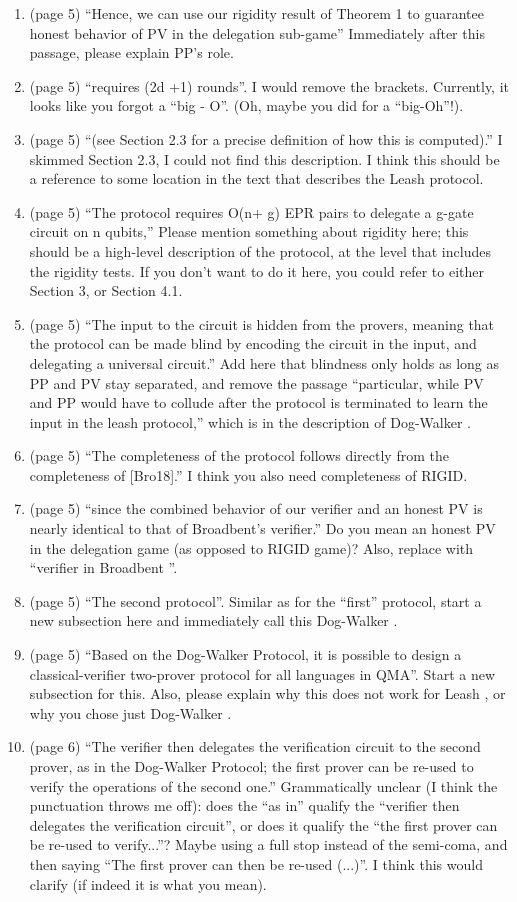 \documentclass[12pt]{article}
\newcommand{\DW}{{\sf Dog-Walker }}
\newcommand{\Leash}{{\sf Leash }}
\newcommand{\Broad}{{\sf Broadbent }}
\begin{document}
\begin{enumerate}
\item (page 5) ``Hence, we can use our rigidity result of Theorem 1
to guarantee honest behavior of PV in the delegation sub-game'' Immediately after this passage, please explain PP's role.
\item (page 5) ``requires (2d +1) rounds''. I would remove the brackets. Currently, it looks like you forgot a ``big - O''. (Oh, maybe you did for a ``big-Oh''!).
\item (page 5) ``(see Section 2.3 for a precise definition of how this is computed).'' I skimmed Section 2.3, I could not find this description. I think this should be a reference to some location in the text that describes the \Leash protocol.
    \item (page 5) ``The protocol requires O(n+ g) EPR pairs
to delegate a g-gate circuit on n qubits,'' Please mention something about rigidity here; this should be a high-level description of the protocol, at the level that includes the rigidity tests. If you don't want to do it here, you could refer to either Section 3, or Section 4.1.
\item (page 5) ``The
input to the circuit is hidden from the provers, meaning that the protocol can be made blind by encoding the
circuit in the input, and delegating a universal circuit.'' Add here that blindness only holds as long as PP and PV stay separated, and remove the passage ``particular,
while PV and PP would have to collude after the protocol is terminated to learn the input in the leash
protocol,'' which is in the description of \DW.
\item (page 5) ``The completeness of the protocol follows directly from the completeness of [Bro18].'' I think you also need completeness of RIGID.
\item (page 5) ``since the combined
behavior of our verifier and an honest PV is nearly identical to that of Broadbent’s verifier.'' Do you mean an honest PV in the delegation game (as opposed to RIGID game)? Also, replace with ``verifier in \Broad''.
\item (page 5) ``The second protocol''. Similar as for the ``first'' protocol, start a new subsection here and immediately call this  \DW.
\item (page 5) ``Based on the Dog-Walker Protocol, it is possible to design a classical-verifier two-prover protocol for
all languages in QMA''. Start a new subsection for this. Also, please explain why this does not work for \Leash, or why you chose just \DW.
\item (page 6) ``The verifier then delegates the verification circuit to the second prover, as in the Dog-Walker Protocol; the first prover can be re-used to verify the operations of the second one.'' Grammatically unclear (I think the punctuation throws me off): does the ``as in'' qualify the ``verifier then delegates the verification circuit'', or does it qualify the ``the first prover can be re-used to verify...''? Maybe using a full stop instead of the semi-coma, and then saying ``The first prover can then be re-used (...)''. I think this would clarify (if indeed it is what you mean).

\end{enumerate}
\end{document}
